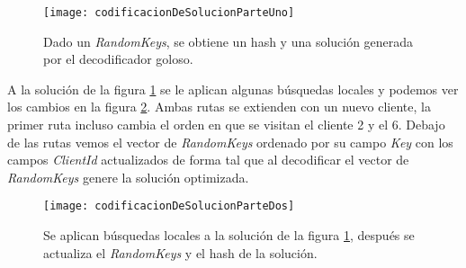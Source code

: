 \bigskip

\begin{figure}[h]
	\caption{Dado un \textit{RandomKeys}, se obtiene un hash y una solución generada por el decodificador goloso.}
	\centering
	\texttt{[image: codificacionDeSolucionParteUno]}
	\label{fig:codificacionDeSolucionUno}
\end{figure}

\bigskip

A la solución de la figura \ref{fig:codificacionDeSolucionUno} se le aplican algunas búsquedas locales y podemos ver los cambios en la figura \ref{fig:codificacionDeSolucionDos}. Ambas rutas se extienden con un nuevo cliente, la primer ruta incluso cambia el orden en que se visitan el cliente 2 y el 6. Debajo de las rutas vemos el vector de \textit{RandomKeys} ordenado por su campo \textit{Key} con los campos \textit{ClientId} actualizados de forma tal que al decodificar el vector de \textit{RandomKeys} genere la solución optimizada.

\bigskip

\begin{figure}[h]
    \caption{Se aplican búsquedas locales a la solución de la figura \ref{fig:codificacionDeSolucionUno}, después se actualiza el \textit{RandomKeys} y el hash de la solución. }
    \centering
    \texttt{[image: codificacionDeSolucionParteDos]}
    \label{fig:codificacionDeSolucionDos}
\end{figure} 

